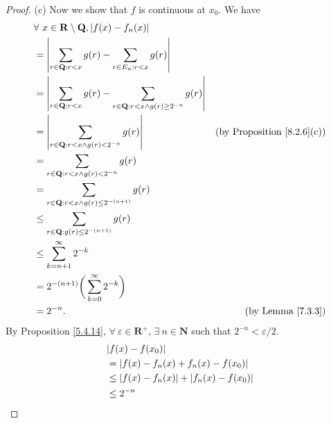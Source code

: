 \begin{proof}{(c)}
    Now we show that \(f\) is continuous at \(x_0\).
    We have
    \begin{align*}
         & \forall\ x \in \mathbf{R} \setminus \mathbf{Q}, \abs*{f(x) - f_n(x)}                                                                                 \\
         & = \abs*{\sum_{r \in \mathbf{Q} : r < x} g(r) - \sum_{r \in E_n : r < x} g(r)}                                                                        \\
         & = \abs*{\sum_{r \in \mathbf{Q} : r < x} g(r) - \sum_{r \in \mathbf{Q} : r < x \land g(r) \geq 2^{-n}} g(r)}                                          \\
         & = \abs*{\sum_{r \in \mathbf{Q} : r < x \land g(r) < 2^{-n}} g(r)}                                           & \text{(by Proposition \ref{8.2.6}(c))} \\
         & = \sum_{r \in \mathbf{Q} : r < x \land g(r) < 2^{-n}} g(r)                                                                                           \\
         & = \sum_{r \in \mathbf{Q} : r < x \land g(r) \leq 2^{-(n + 1)}} g(r)                                                                                  \\
         & \leq \sum_{r \in \mathbf{Q} : g(r) \leq 2^{-(n + 1)}} g(r)                                                                                           \\
         & \leq \sum_{k = n + 1}^\infty 2^{-k}                                                                                                                  \\
         & = 2^{-(n + 1)} \bigg(\sum_{k = 0}^\infty 2^{-k}\bigg)                                                                                                \\
         & = 2^{-n}.                                                                                                   & \text{(by Lemma \ref{7.3.3})}
    \end{align*}
    By Proposition \ref{5.4.14}, \(\forall\ \varepsilon \in \mathbf{R}^+\), \(\exists\ n \in \mathbf{N}\) such that \(2^{-n} < \varepsilon / 2\).
    \begin{align*}
         & \abs*{f(x) - f(x_0)}                               \\
         & = \abs*{f(x) - f_n(x) + f_n(x) - f(x_0)}           \\
         & \leq \abs*{f(x) - f_n(x)} + \abs*{f_n(x) - f(x_0)} \\
         & \leq 2^{-n}
    \end{align*}
\end{proof}